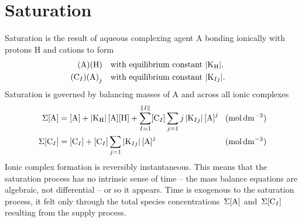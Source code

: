 \documentclass[a4paper]{base}
\begin{document}
\section{Saturation}\label{sec:Sat}
    Saturation is the result of aqueous complexing agent A bonding ionically with protons H and cations  to form
    \begin{equation}\label{eq:Sat:Complexes}
        \begin{aligned}
            \dn{(A)(H)} &\QT{with equilibrium constant $\mds{\dn{K_H}}$.} \\
            (\dn[I]{C})\dn[j]{(A)} &\QT{with equilibrium constant $\mds{\dn[Ij]{K}}$.}
        \end{aligned}
    \end{equation}
    Saturation is governed by balancing masses of A and  across all ionic complexes
    \begin{equation}\label{eq:Sat:MBD}
        \begin{aligned}
            \tot{\cn{A}} &= \cn{A} + \mds{\dn{K_H}}\cn{A}\cn{H}+ \sum_{I=1}^{\norm{I}} \cn[I]{C} \sum_{j=1} j\mds{\dn[Ij]{K}} \cn{A}^{j} &\un{mol\, dm^{-3}}\\
            \tot{\cn[I]{C}} &= \cn[I]{C} + \cn[I]{C} \sum_{j=1} \mds{\dn[Ij]{K}} \cn{A}^{j} &\un{mol\, dm^{-3}}\\
        \end{aligned}
    \end{equation}
    Ionic complex formation is reversibly instantaneous. This means that the saturation process has no intrinsic sense of time -- the mass balance equations are algebraic, not differential -- or so it appears. Time is exogenous to the saturation process, it felt only through the total species concentrations $\tot{\cn{A}}$ and $\tot{\cn[I]{C}}$ resulting from the supply process.
\end{document}
